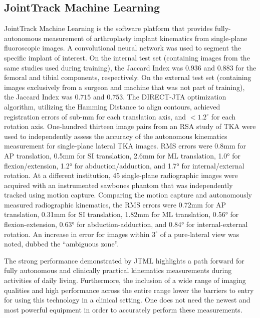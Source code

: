 \subsection{JointTrack Machine Learning}
JointTrack Machine Learning is the software platform that provides fully-autonomous measurement of arthroplasty implant kinematics from single-plane fluoroscopic images.
A convolutional neural network was used to segment the specific implant of interest.
On the internal test set (containing images from the same studies used during training), the Jaccard Index was $0.936$ and $0.883$ for the femoral and tibial components, respectively.
On the external test set (containing images exclusively from a surgeon and machine that was not part of training), the Jaccard Index was $0.715$ and $0.753$.
The DIRECT-JTA optimization algorithm, utilizing the Hamming Distance to align contours, achieved registration errors of sub-mm for each translation axis, and $<1.2^{\circ}$ for each rotation axis.
One-hundred thirteen image pairs from an RSA study of TKA were used to independently assess the accuracy of the autonomous kinematics measurement for single-plane lateral TKA images.
RMS errors were 0.8mm for AP translation, 0.5mm for SI translation, 2.6mm for ML translation, 1.0° for flexion/extension, 1.2° for abduction/adduction, and 1.7° for internal/external rotation.
At a different institution, 45 single-plane radiographic images were acquired with an instrumented sawbones phantom that was independently tracked using motion capture.
Comparing the motion capture and autonomously measured radiographic kinematics, the RMS errors were 0.72mm for AP translation, 0.31mm for SI translation, 1.82mm for ML translation, 0.56° for flexion-extension, 0.63° for abduction-adduction, and 0.84° for internal-external rotation.
An increase in error for images within $3^{\circ}$ of a pure-lateral view was noted, dubbed the ``ambiguous zone''.

The strong performance demonstrated by JTML highlights a path forward for fully autonomous and clinically practical kinematics measurements during activities of daily living.
Furthermore, the inclusion of a wide range of imaging qualities and high performance across the entire range lower the barriers to entry for using this technology in a clinical setting.
One does not need the newest and most powerful equipment in order to accurately perform these measurements.



